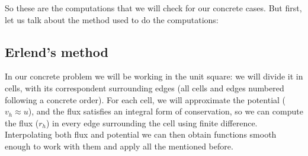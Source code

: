 \documentclass{article}
\begin{document}
    So these are the computations that we will check for our concrete cases. But first, let us talk about the method used to do the computations:
    \subsection*{Erlend's method}
    In our concrete problem we will be working in the unit square: we will divide it in cells, with its correspondent surrounding edges (all cells and edges numbered following a concrete order). For each cell, we will approximate the potential ($v_h \approx u$), and the flux satisfies an integral form of conservation, so we can compute the flux ($r_h$) in every edge surrounding the cell using finite difference. Interpolating both flux and potential we can then obtain functions smooth enough to work with them and apply all the mentioned before. 
\end{document}
